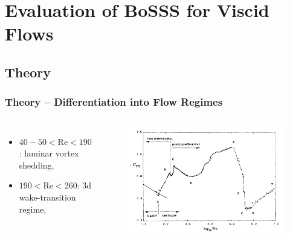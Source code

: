 \section{Evaluation of BoSSS for Viscid Flows}
\frame{\tableofcontents[currentsection]}
	\subsection{Theory}
	\begin{frame}
		\frametitle{Theory -- Differentiation into Flow Regimes}
		\begin{columns}[t]
			\column[]{5cm}
			\begin{itemize}
				\vspace{-1cm}
				\item $40-50 < \text{Re} < 190$: laminar vortex shedding,
				\item $190 < \text{Re} < 260$: \gls{3d} wake-transition regime,
			\end{itemize}
			\column[]{7cm}
			\begin{figure}[ht]
				 \vspace{-1cm}
				\includegraphics[width=\textwidth]{img/overviewCylinderReynolds_Williamson.PNG}
			\end{figure}
		\end{columns}
	\end{frame}
